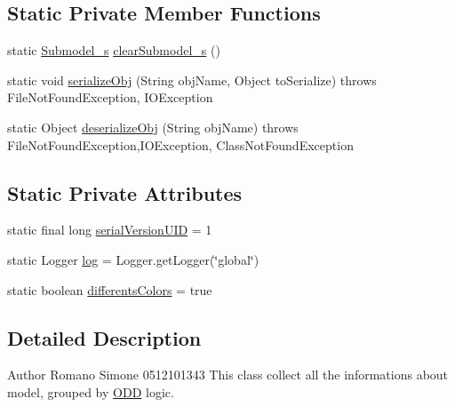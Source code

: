 \subsection*{Static Private Member Functions}
\begin{DoxyCompactItemize}
\item 
static \hyperlink{classit_1_1isislab_1_1masonassisteddocumentation_1_1_o_d_d_1_1_submodel__s}{Submodel\-\_\-s} \hyperlink{classit_1_1isislab_1_1masonassisteddocumentation_1_1_o_d_d_1_1_o_d_d_a40cc43dbe2785cabf2ffc7adba8854ea}{clear\-Submodel\-\_\-s} ()
\item 
static void \hyperlink{classit_1_1isislab_1_1masonassisteddocumentation_1_1_o_d_d_1_1_o_d_d_ad5d017db56b0de89cc188dae97686520}{serialize\-Obj} (String obj\-Name, Object to\-Serialize)  throws File\-Not\-Found\-Exception, I\-O\-Exception 
\item 
static Object \hyperlink{classit_1_1isislab_1_1masonassisteddocumentation_1_1_o_d_d_1_1_o_d_d_a75152526b3e9c34426668dd578544240}{deserialize\-Obj} (String obj\-Name)  throws File\-Not\-Found\-Exception,\-I\-O\-Exception, Class\-Not\-Found\-Exception 
\end{DoxyCompactItemize}
\subsection*{Static Private Attributes}
\begin{DoxyCompactItemize}
\item 
static final long \hyperlink{classit_1_1isislab_1_1masonassisteddocumentation_1_1_o_d_d_1_1_o_d_d_ac238b8ebd36c3cedcbdc92bee657a0a5}{serial\-Version\-U\-I\-D} = 1
\item 
static Logger \hyperlink{classit_1_1isislab_1_1masonassisteddocumentation_1_1_o_d_d_1_1_o_d_d_aa7bb6621e0659ee87baa2d71ba1720d3}{log} = Logger.\-get\-Logger(\char`\"{}global\char`\"{})
\item 
static boolean \hyperlink{classit_1_1isislab_1_1masonassisteddocumentation_1_1_o_d_d_1_1_o_d_d_a5e99cecaa409eacae00aceb1bbd62a56}{differents\-Colors} = true
\end{DoxyCompactItemize}


\subsection{Detailed Description}
\begin{DoxyAuthor}{Author}
Romano Simone 0512101343 This class collect all the informations about model, grouped by \hyperlink{classit_1_1isislab_1_1masonassisteddocumentation_1_1_o_d_d_1_1_o_d_d}{O\-D\-D} logic. 
\end{DoxyAuthor}


